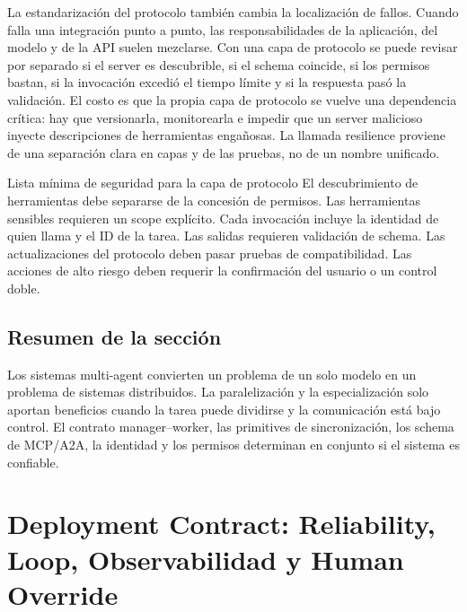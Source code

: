 \documentclass[a4paper]{article}
\begin{document}
La estandarización del protocolo también cambia la localización de fallos. Cuando falla una integración punto a punto, las responsabilidades de la aplicación, del modelo y de la API suelen mezclarse. Con una capa de protocolo se puede revisar por separado si el server es descubrible, si el schema coincide, si los permisos bastan, si la invocación excedió el tiempo límite y si la respuesta pasó la validación. El costo es que la propia capa de protocolo se vuelve una dependencia crítica: hay que versionarla, monitorearla e impedir que un server malicioso inyecte descripciones de herramientas engañosas. La llamada resilience proviene de una separación clara en capas y de las pruebas, no de un nombre unificado.


\begin{importantbox}{Lista mínima de seguridad para la capa de protocolo}
El descubrimiento de herramientas debe separarse de la concesión de permisos. Las herramientas sensibles requieren un scope explícito. Cada invocación incluye la identidad de quien llama y el ID de la tarea. Las salidas requieren validación de schema. Las actualizaciones del protocolo deben pasar pruebas de compatibilidad. Las acciones de alto riesgo deben requerir la confirmación del usuario o un control doble.
\end{importantbox}

\subsection{Resumen de la sección}

Los sistemas multi-agent convierten un problema de un solo modelo en un problema de sistemas distribuidos. La paralelización y la especialización solo aportan beneficios cuando la tarea puede dividirse y la comunicación está bajo control. El contrato manager--worker, las primitives de sincronización, los schema de MCP/A2A, la identidad y los permisos determinan en conjunto si el sistema es confiable.
\section{Deployment Contract: Reliability, Loop, Observabilidad y Human Override}
\end{document}

